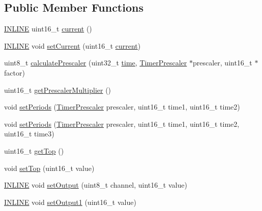 \subsection*{Public Member Functions}
\begin{DoxyCompactItemize}
\item 
\hyperlink{io_8h_a2eb6f9e0395b47b8d5e3eeae4fe0c116}{I\-N\-L\-I\-N\-E} uint16\-\_\-t \hyperlink{classflame_1_1_timer_implementation_a059cf0b61ce2a5401e0eac765d592876}{current} ()
\item 
\hyperlink{io_8h_a2eb6f9e0395b47b8d5e3eeae4fe0c116}{I\-N\-L\-I\-N\-E} void \hyperlink{classflame_1_1_timer_implementation_ae5ad66785471cc2c284662b347973b00}{set\-Current} (uint16\-\_\-t \hyperlink{classflame_1_1_timer_implementation_a059cf0b61ce2a5401e0eac765d592876}{current})
\item 
uint8\-\_\-t \hyperlink{classflame_1_1_timer_implementation_abec9c25e312eb36bfb693f67739c2375}{calculate\-Prescaler} (uint32\-\_\-t \hyperlink{structflame_1_1time}{time}, \hyperlink{namespaceflame_a24dfd057ba5ab5a827abbc4ed902a087}{Timer\-Prescaler} $\ast$prescaler, uint16\-\_\-t $\ast$factor)
\item 
uint16\-\_\-t \hyperlink{classflame_1_1_timer_implementation_a78fb5b014f05a5116c74edd893589850}{get\-Prescaler\-Multiplier} ()
\item 
void \hyperlink{classflame_1_1_timer_implementation_af94598e1bd64d41383def5a64393f986}{set\-Periods} (\hyperlink{namespaceflame_a24dfd057ba5ab5a827abbc4ed902a087}{Timer\-Prescaler} prescaler, uint16\-\_\-t time1, uint16\-\_\-t time2)
\item 
void \hyperlink{classflame_1_1_timer_implementation_a506d40fad888634925df6d3f129e2099}{set\-Periods} (\hyperlink{namespaceflame_a24dfd057ba5ab5a827abbc4ed902a087}{Timer\-Prescaler} prescaler, uint16\-\_\-t time1, uint16\-\_\-t time2, uint16\-\_\-t time3)
\item 
uint16\-\_\-t \hyperlink{classflame_1_1_timer_implementation_a6a5d38f11e26fa6283af22691bc1e0f4}{get\-Top} ()
\item 
void \hyperlink{classflame_1_1_timer_implementation_aedf65ab8b5ea5b7d1eca3e16a1993d5a}{set\-Top} (uint16\-\_\-t value)
\item 
\hyperlink{io_8h_a2eb6f9e0395b47b8d5e3eeae4fe0c116}{I\-N\-L\-I\-N\-E} void \hyperlink{classflame_1_1_timer_implementation_a62a263dea1b2846908b1e8c9608420f8}{set\-Output} (uint8\-\_\-t channel, uint16\-\_\-t value)
\item 
\hyperlink{io_8h_a2eb6f9e0395b47b8d5e3eeae4fe0c116}{I\-N\-L\-I\-N\-E} void \hyperlink{classflame_1_1_timer_implementation_a73813adc78b7a675018ebf81a2bc74aa}{set\-Output1} (uint16\-\_\-t value)

\end{DoxyCompactItemize}
